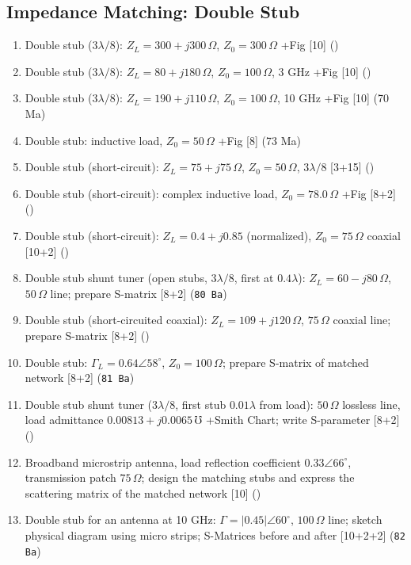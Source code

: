 \documentclass[12pt]{article}
\begin{document}
  \subsection{Impedance Matching: Double Stub}
    \begin{enumerate}[topsep=0pt, noitemsep]
      \item Double stub ($3\lambda/8$): $Z_L = 300{+}j300\,\Omega$, $Z_0 = 300\,\Omega$ +Fig \hfill [10] ()
      \item Double stub ($3\lambda/8$): $Z_L = 80{+}j180\,\Omega$, $Z_0 = 100\,\Omega$, 3 GHz +Fig \hfill [10] ()
      \item Double stub ($3\lambda/8$): $Z_L = 190{+}j110\,\Omega$, $Z_0 = 100\,\Omega$, 10 GHz +Fig \hfill [10] (70 Ma)
      \item Double stub: inductive load, $Z_0 = 50\,\Omega$ +Fig \hfill [8] (73 Ma)
      \item Double stub (short-circuit): $Z_L = 75{+}j75\,\Omega$, $Z_0 = 50\,\Omega$, $3\lambda/8$ \hfill [3+15] ()
      \item Double stub (short-circuit): complex inductive load, $Z_0 = 78.0\,\Omega$ +Fig \hfill [8+2] ()
      \item Double stub (short-circuit): $Z_L = 0.4{+}j0.85$ (normalized), $Z_0 = 75\,\Omega$ coaxial \hfill [10+2] ()
      \item Double stub shunt tuner (open stubs, $3\lambda/8$, first at $0.4\lambda$): $Z_L = 60{-}j80\,\Omega$, $50\,\Omega$ line; prepare S-matrix \hfill [8+2] (\texttt{80 Ba})
      \item Double stub (short-circuited coaxial): $Z_L = 109{+}j120\,\Omega$, $75\,\Omega$ coaxial line; prepare S-matrix \hfill [8+2] ()
      \item Double stub: $\Gamma_L = 0.64\angle58^\circ$, $Z_0 = 100\,\Omega$; prepare S-matrix of matched network \hfill [8+2] (\texttt{81 Ba})
      \item Double stub shunt tuner ($3\lambda/8$, first stub $0.01\lambda$ from load): $50\,\Omega$ lossless line, load admittance $0.00813{+}j0.0065\,\mho$ +Smith Chart; write S-parameter \hfill [8+2] ()
      \item Broadband microstrip antenna, load reflection coefficient $0.33\angle66^\circ$, transmission patch $75\,\Omega$; design the matching stubs and express the scattering matrix of the matched network \hfill [10] ()
      \item Double stub for an antenna at 10 GHz: $\Gamma = |0.45|\angle60^\circ$, $100\,\Omega$ line; sketch physical diagram using micro strips; S-Matrices before and after \hfill [10+2+2] (\texttt{82 Ba})

\end{enumerate}
\end{document}
